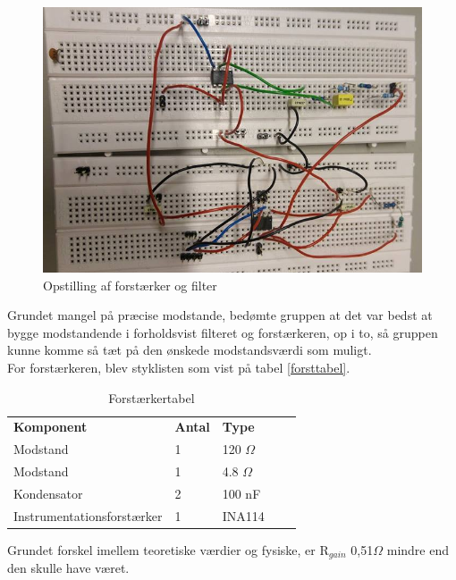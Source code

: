 \begin{figure}[H]
	\centering
	\includegraphics[width=1\textwidth]{Figurer/Hardware/samletopstilling}
	\caption{Opstilling af forstærker og filter}
	\label{samletopbygning}
\end{figure}

Grundet mangel på præcise modstande, bedømte gruppen at det var bedst at bygge modstandende i forholdsvist filteret og forstærkeren, op i to, så gruppen kunne komme så tæt på den ønskede modstandsværdi som muligt. \\
For forstærkeren, blev styklisten som vist på tabel \ref{forsttabel}.



\begin{table}[H]
\centering
\begin{tabular}{lllll}
\textbf{Komponent} & \textbf{Antal} & \textbf{Type}  &  &  \\ \cline{1-3}
Modstand           & 1              & 120 $\Omega$   &  &  \\ \cline{1-3}
Modstand           & 1              & 4.8 $\Omega$   &  &  \\ \cline{1-3}
Kondensator        & 2              & 100 nF         &  &  \\ \cline{1-3}
Instrumentationsforstærker &    1   & INA114		     &  &  \\ \cline{1-3}
\end{tabular}
\caption{Forstærkertabel}
\label{Forsttabel}
\end{table}

Grundet forskel imellem teoretiske værdier og fysiske, er R$_{gain}$ 0,51$\Omega$ mindre end den skulle have været.\\

